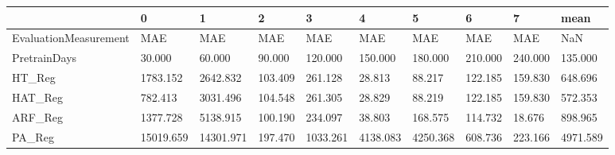 \begin{tabular}{llllllllll}
\toprule
{} &         0 &         1 &       2 &        3 &        4 &        5 &       6 &       7 &     mean \\
\midrule
EvaluationMeasurement &       MAE &       MAE &     MAE &      MAE &      MAE &      MAE &     MAE &     MAE &      NaN \\
PretrainDays          &    30.000 &    60.000 &  90.000 &  120.000 &  150.000 &  180.000 & 210.000 & 240.000 &  135.000 \\
HT\_Reg                &  1783.152 &  2642.832 & 103.409 &  261.128 &   28.813 &   88.217 & 122.185 & 159.830 &  648.696 \\
HAT\_Reg               &   782.413 &  3031.496 & 104.548 &  261.305 &   28.829 &   88.219 & 122.185 & 159.830 &  572.353 \\
ARF\_Reg               &  1377.728 &  5138.915 & 100.190 &  234.097 &   38.803 &  168.575 & 114.732 &  18.676 &  898.965 \\
PA\_Reg                & 15019.659 & 14301.971 & 197.470 & 1033.261 & 4138.083 & 4250.368 & 608.736 & 223.166 & 4971.589 \\
\bottomrule
\end{tabular}
